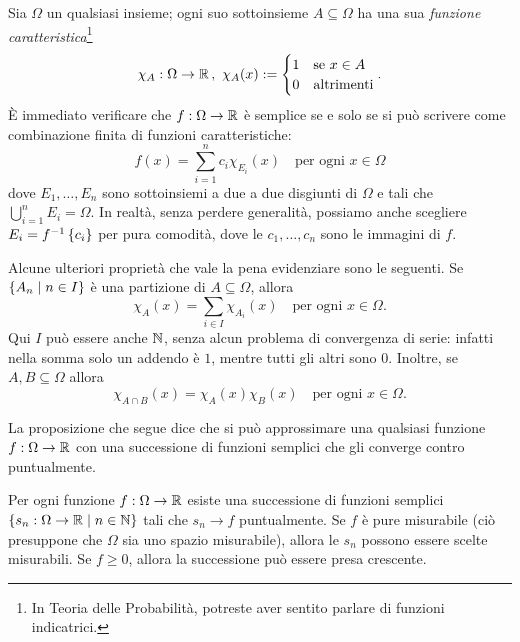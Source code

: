 Sia \(\Omega\) un qualsiasi insieme; ogni suo sottoinsieme \(A \subseteq \Omega\) ha una sua {\em funzione caratteristica}\footnote{In Teoria delle Probabilità, potreste aver sentito parlare di funzioni indicatrici.}
\[\chi_A : \Omega \to \mathbb R \,,\ \chi_A(x) := \begin{cases} 1 & \text{se } x \in A \\ 0 & \text{altrimenti} \end{cases}.\]
%
È immediato verificare che \(f : \Omega \to \mathbb R\) è semplice se e solo se si può scrivere come combinazione finita di funzioni caratteristiche:
\[f(x) = \sum_{i=1}^n c_i\chi_{E_i}(x) \quad \text{per ogni } x \in \Omega\]
dove \(E_1, \dots{}, E_n\) sono sottoinsiemi a due a due disgiunti di \(\Omega\) e tali che \(\bigcup_{i = 1}^n E_i = \Omega\).
In realtà, senza perdere generalità, possiamo anche scegliere \(E_i = f^{-1}\left\{c_i\right\}\) per pura comodità, dove le \(c_1, \dots{}, c_n\) sono le immagini di \(f\).

Alcune ulteriori proprietà che vale la pena evidenziare sono le seguenti. Se \(\left\{A_n \mid n \in I\right\}\) è una partizione di \(A \subseteq \Omega\), allora
\[\chi_A(x) = \sum_{i \in I} \chi_{A_i}(x) \quad \text{per ogni } x \in \Omega .\]
Qui \(I\) può essere anche \(\mathbb N\), senza alcun problema di convergenza di serie: infatti nella somma solo un addendo è \(1\), mentre tutti gli altri sono \(0\). Inoltre, se \(A, B \subseteq \Omega\) allora
\[\chi_{A \cap B}(x) = \chi_A(x) \chi_B(x) \quad \text{per ogni } x \in \Omega .\]

La proposizione che segue dice che si può approssimare una qualsiasi funzione \(f : \Omega \to \mathbb R\) con una successione di funzioni semplici che gli converge contro puntualmente.

\begin{lemma}\label{lemma:FunzioniRealiLimitiPuntualiDiFunzioniSemplici}
Per ogni funzione \(f : \Omega \to \mathbb R\) esiste una successione di funzioni semplici \(\left\{s_n : \Omega \to \mathbb R \mid n \in \mathbb N\right\}\) tali che \(s_n \to f\) puntualmente. Se \(f\) è pure misurabile (ciò presuppone che \(\Omega\) sia uno spazio misurabile), allora le \(s_n\) possono essere scelte misurabili. Se \(f \ge 0\), allora la successione può essere presa crescente.
\end{lemma}

